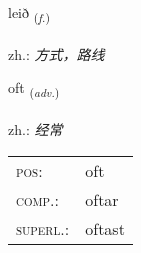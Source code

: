 \documentclass[frontgrid, backgrid]{flacards}\usepackage[]{graphicx}\usepackage[]{xcolor}
\begin{document}
\renewcommand{\flhead}{\vskip5pt \fboxsep=0pt {\small\bfseries\footnotesize Nafnorð | 名词}}
\renewcommand{\fcfoot}{\vskip5pt \fboxsep=0pt \hspace{2pt}{\small\bfseries\footnotesize 1K}}

\renewcommand{\blhead}{\vskip5pt {\small\bfseries\footnotesize Nafnorð | 名词 }}
\renewcommand{\bcfoot}{\vskip5pt \hspace{2pt}{\small\bfseries\footnotesize 1K}}


{leið \small{\textsubscript{(\textit{f.})}} \\[1ex] %
\textphonetic{[leiːð]} \\
zh.: \emph{方式，路线} \\  [2ex]
\renewcommand*{\arraystretch}{0.8}
}

\renewcommand{\flhead}{\vskip5pt \fboxsep=0pt {\small\bfseries\footnotesize Atviksorð | 副词}}
\renewcommand{\fcfoot}{\vskip5pt \fboxsep=0pt \hspace{2pt}{\small\bfseries\footnotesize 1K}}

\renewcommand{\blhead}{\vskip5pt {\small\bfseries\footnotesize Atviksorð | 副词 }}
\renewcommand{\bcfoot}{\vskip5pt \hspace{2pt}{\small\bfseries\footnotesize 1K}}


{oft \small{\textsubscript{(\textit{adv.})}} \\[1ex] %
\textphonetic{[ɔft]} \\
zh.: \emph{经常} \\  [2ex]
\renewcommand*{\arraystretch}{0.8}
\begin{tabular}{ll}
\textsc{pos}: & oft \\ 
\textsc{comp.}: & oftar \\ 
\textsc{superl.}: & oftast \\
\end{tabular}
}
\end{document}
